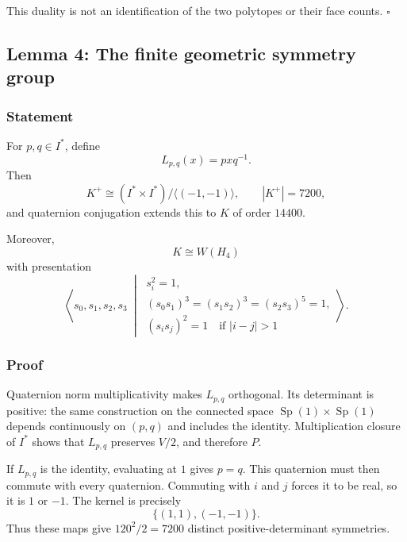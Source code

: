 \documentclass[
  10pt,
  a4paper,
]{article}
\begin{document}
This duality is not an identification of the two polytopes or their face
counts. \(\square\)

\subsection{Lemma 4: The finite geometric symmetry
group}\label{lemma-4-the-finite-geometric-symmetry-group}

\subsubsection{Statement}\label{statement-3}

For \(p,q\in I^*\), define \begin{equation}
L_{p,q}(x)=pxq^{-1}.
\end{equation} Then \begin{equation}
K^+\cong (I^*\times I^*)/\langle(-1,-1)\rangle,
\qquad |K^+|=7200,
\end{equation} and quaternion conjugation extends this to \(K\) of order
\(14400\).

Moreover, \begin{equation}
K\cong W(H_4)
\end{equation} with presentation \begin{equation}
\left\langle s_0,s_1,s_2,s_3\ \middle|\
\begin{array}{l}
s_i^2=1,\\
(s_0s_1)^3=(s_1s_2)^3=(s_2s_3)^5=1,\\
(s_is_j)^2=1\quad\text{if }|i-j|>1
\end{array}
\right\rangle.
\end{equation}

\subsubsection{Proof}\label{proof-3}

Quaternion norm multiplicativity makes \(L_{p,q}\) orthogonal. Its
determinant is positive: the same construction on the connected space
\(\operatorname{Sp}(1)\times\operatorname{Sp}(1)\) depends continuously
on \((p,q)\) and includes the identity. Multiplication closure of
\(I^*\) shows that \(L_{p,q}\) preserves \(V/2\), and therefore \(P\).

If \(L_{p,q}\) is the identity, evaluating at \(1\) gives \(p=q\). This
quaternion must then commute with every quaternion. Commuting with \(i\)
and \(j\) forces it to be real, so it is \(1\) or \(-1\). The kernel is
precisely \begin{equation}
\{(1,1),(-1,-1)\}.
\end{equation} Thus these maps give \(120^2/2=7200\) distinct
positive-determinant symmetries.
\end{document}
